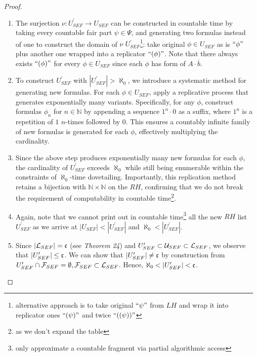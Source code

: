 \begin{proof}
\begin{enumerate}
    \item The surjection $\nu: U^\prime_{SEF} \to U_{SEF}$ can be constructed in countable time by taking every countable fair part $\psi \in \Psi$, and generating two formulas instead of one to construct the domain of $\nu$ $U^\prime_{SEF}$\footnote{alternative approach is to take original $\text{``} \psi \text{''}$ from $LH$ and wrap it into replicator ones $\text{``} (\psi) \text{''}$ and twice $\text{``} ((\psi)) \text{''}$}: take original $\phi \in U_{SEF}$ as is $\text{``} \phi \text{''}$ plus another one wrapped into a replicator $\text{``} (\phi) \text{''}$. Note that there always exists $\text{``} (\phi) \text{''}$ for every $\phi \in U_{SEF}$ since each $\phi$ has form of $A \cdot \overline{b}$. 
    
    \item To construct \( U^\prime_{SEF} \) with \( |U^\prime_{SEF}| > \aleph_0 \), we introduce a systematic method for generating new formulas. For each \( \phi \in U_{SEF} \), apply a replicative process that generates exponentially many variants. Specifically, for any \( \phi \), construct formulas \( \phi_n \) for \( n \in \mathbb{N} \) by appending a sequence \( 1^n \cdot 0 \) as a suffix, where \( 1^n \) is a repetition of \( 1 \) \( n \)-times followed by \( 0 \). This ensures a countably infinite family of new formulas is generated for each \( \phi \), effectively multiplying the cardinality.
    
    \item Since the above step produces exponentially many new formulas for each \( \phi \), the cardinality of \( U^\prime_{SEF} \) exceeds \( \aleph_0 \) while still being enumerable within the constraints of \( \aleph_0 \)-time dovetailing. Importantly, this replication method retains a bijection with \( \mathbb{N} \times \mathbb{N} \) on  the $RH$, confirming that we do not break the requirement of computability in countable time\footnote{as we don't expand the table}.

    \item Again, note that we cannot print out in countable time\footnote{only approximate a countable fragment via partial algorithmic access} all the new $RH$ list $U^\prime_{SEF}$ as we arrive at $|U_{SEF}| < |U^\prime_{SEF}|$ and $\aleph_0 < |U^\prime_{SEF}|$.
    \item Since $|\mathcal{L}_{SEF}| = \mathfrak{c}$ (see \textit{Theorem 24}) and $U^\prime_{SEF} \subset \mathcal{U}_{SEF} \subset \mathcal{L}_{SEF} $, we observe that $|U^\prime_{SEF}| \leq \mathfrak{c}$. We can show that $|U^\prime_{SEF}| \neq \mathfrak{c}$ by construction from $U^\prime_{SEF} \cap \mathcal{F}_{SEF} = \emptyset, \mathcal{F}_{SEF} \subset \mathcal{L}_{SEF}$. Hence, $\aleph_0 < |U^\prime_{SEF}| < \mathfrak{c}$.
  \end{enumerate}
\end{proof}

